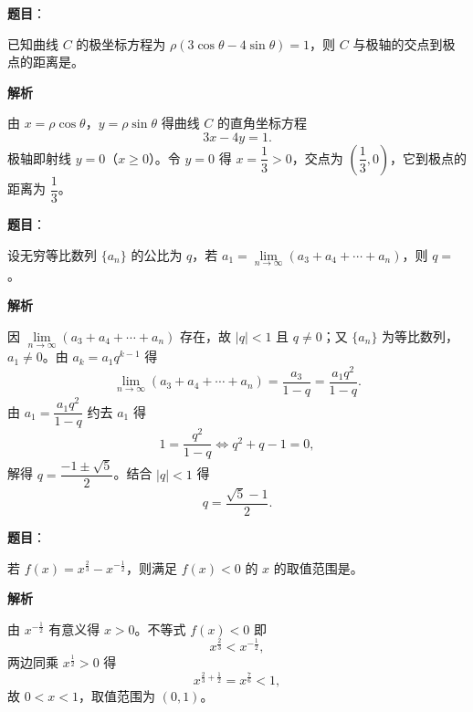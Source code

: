\begin{answer}

\textbf{题目}：

已知曲线 $C$ 的极坐标方程为 $\rho(3\cos\theta-4\sin\theta)=1$，则 $C$ 与极轴的交点到极点的距离是\gkblank{}。

\textbf{解析}

由 $x=\rho\cos\theta$，$y=\rho\sin\theta$ 得曲线 $C$ 的直角坐标方程
\nopagebreak[4]
\[3x-4y=1 .\]
极轴即射线 $y=0$（$x\geqslant0$）。令 $y=0$ 得 $x=\dfrac13>0$，交点为 $\left(\dfrac13,0\right)$，它到极点的距离为 $\dfrac13$。


\end{answer}
\begin{answer}

\textbf{题目}：

设无穷等比数列 $\{a_n\}$ 的公比为 $q$，若 $a_1=\lim\limits_{n\to\infty}(a_3+a_4+\cdots+a_n)$，则 $q=$\gkblank{}。

\textbf{解析}

因 $\lim\limits_{n\to\infty}(a_3+a_4+\cdots+a_n)$ 存在，故 $|q|<1$ 且 $q\neq0$；又 $\{a_n\}$ 为等比数列，$a_1\neq0$。由 $a_k=a_1q^{k-1}$ 得
\nopagebreak[4]
\[\lim_{n\to\infty}(a_3+a_4+\cdots+a_n)=\frac{a_3}{1-q}=\frac{a_1q^2}{1-q}.\]
由 $a_1=\dfrac{a_1q^2}{1-q}$ 约去 $a_1$ 得
\nopagebreak[4]
\[1=\frac{q^2}{1-q}\iff q^2+q-1=0,\]
解得 $q=\dfrac{-1\pm\sqrt5}{2}$。结合 $|q|<1$ 得
\nopagebreak[4]
\[q=\frac{\sqrt5-1}{2}.\]


\end{answer}
\begin{answer}

\textbf{题目}：

若 $f(x)=x^{\frac23}-x^{-\frac12}$，则满足 $f(x)<0$ 的 $x$ 的取值范围是\gkblank{}。

\textbf{解析}

由 $x^{-\frac12}$ 有意义得 $x>0$。不等式 $f(x)<0$ 即
\nopagebreak[4]
\[x^{\frac23}<x^{-\frac12},\]
两边同乘 $x^{\frac12}>0$ 得
\nopagebreak[4]
\[x^{\frac23+\frac12}=x^{\frac76}<1,\]
故 $0<x<1$，取值范围为 $(0,1)$。


\end{answer}
